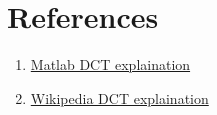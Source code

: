 \chapter{References}
\begin{enumerate}
    \item {\hypersetup{linkcolor=black,
    urlcolor=blue}\href{https://www.mathworks.com/help/images/discrete-cosine-transform.html}{Matlab DCT explaination}}
    \item {\hypersetup{linkcolor=black,
    urlcolor=blue}\href{https://en.wikipedia.org/wiki/Discrete_cosine_transform#:~:text=of%20computational%20convenience.-,Formal%20definition,into%20the%20N%20real%20numbers}{Wikipedia DCT explaination}}
\end{enumerate}